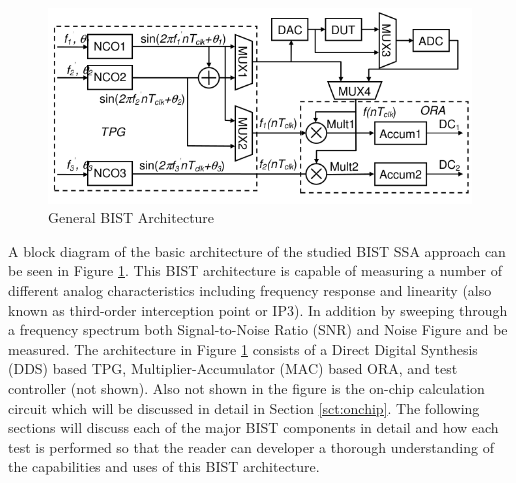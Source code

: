 \documentclass[12pt]{report}
\begin{document}
\begin{figure}
	\begin{center}
		\includegraphics[scale=.5]{images/bist-ssa-architecture}
	\end{center}
	\caption{General BIST Architecture\cite{testtime}}
	\label{fig:bist-ssa}
\end{figure}
A block diagram of the basic architecture of the studied BIST SSA approach can be seen in Figure \ref{fig:bist-ssa}.  This BIST architecture is capable of measuring a number of different analog characteristics including frequency response and linearity (also known as third-order interception point or IP3)\cite{basessa}.  In addition by sweeping through a frequency spectrum both Signal-to-Noise Ratio (SNR) and Noise Figure\cite{noisefigure} and be measured.  The architecture in Figure \ref{fig:bist-ssa} consists of a Direct Digital Synthesis (DDS) based TPG, Multiplier-Accumulator (MAC) based ORA, and test controller (not shown).  Also not shown in the figure is the on-chip calculation circuit which will be discussed in detail in Section \ref{sct:onchip}.  The following sections will discuss each of the major BIST components in detail and how each test is performed so that the reader can developer a thorough understanding of the capabilities and uses of this BIST architecture.
\end{document}
